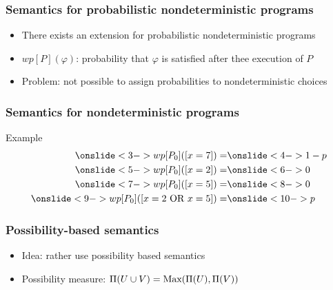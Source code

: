 \documentclass{beamer}
\def\Max {\textnormal {Max}}
\begin{document}
\begin{frame}
\frametitle{Semantics for probabilistic nondeterministic programs}
\begin{itemize}
\item<1-> There exists an extension for probabilistic nondeterministic programs
\item<2-> $wp[P](\varphi)$: probability that $\varphi$ is satisfied after thee execution of $P$
\item<3-> Problem: not possible to assign probabilities to nondeterministic choices\newline
{}
\end{itemize}
\end{frame}


\begin{frame}
\frametitle{Semantics for nondeterministic programs}
\begin{block}{Example}
\begin{align*}
\onslide<3->{wp[P_0]([x = 7]) =} & \onslide<4->{1-p} \\
\onslide<5->{wp[P_0]([x = 2]) =} & \onslide<6->{0} \\
\onslide<7->{wp[P_0]([x = 5]) =} & \onslide<8->{0} \\
\onslide<9->{wp[P_0]([x = 2 \textnormal{ OR } x = 5]) =} & \onslide<10->{p} \\
\end{align*}
\end{block}
\end{frame}

\begin{frame}
\frametitle{Possibility-based semantics}
\begin{itemize}
\item<1-> Idea: rather use possibility based semantics
\item<2-> Possibility measure: $\Pi(U \cup V) = \Max(\Pi(U),\Pi(V))$
\end{itemize}
\end{frame}
\end{document}
